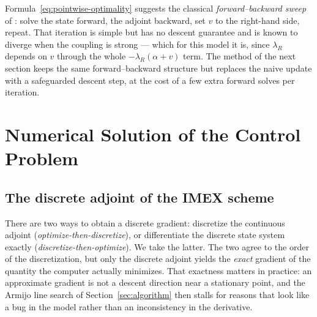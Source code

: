 \documentclass[11pt]{article}
\begin{document}
Formula~\eqref{eq:pointwise-optimality} suggests the classical \emph{forward--backward sweep} of \citet{Lenhart2007}: solve the state forward, the adjoint backward, set $v$ to the right-hand side, repeat. That iteration is simple but has no descent guarantee and is known to diverge when the coupling is strong --- which for this model it is, since $\lambda_R$ depends on $v$ through the whole $-\lambda_R(\alpha+v)$ term. The method of the next section keeps the same forward--backward structure but replaces the naive update with a safeguarded descent step, at the cost of a few extra forward solves per iteration.

\section{Numerical Solution of the Control Problem}
\label{sec:control-numerics}

\subsection{The discrete adjoint of the IMEX scheme}
\label{sec:discrete-adjoint}

There are two ways to obtain a discrete gradient: discretize the continuous adjoint (\emph{optimize-then-discretize}), or differentiate the discrete state system exactly (\emph{discretize-then-optimize}). We take the latter. The two agree to the order of the discretization, but only the discrete adjoint yields the \emph{exact} gradient of the quantity the computer actually minimizes. That exactness matters in practice: an approximate gradient is not a descent direction near a stationary point, and the Armijo line search of Section~\ref{sec:algorithm} then stalls for reasons that look like a bug in the model rather than an inconsistency in the derivative.
\end{document}
